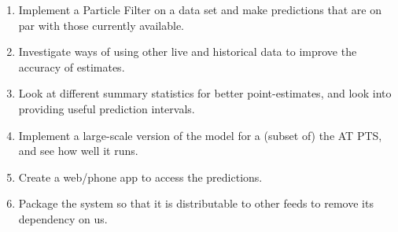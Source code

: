 \documentclass[12pt,a4paper]{article}
\begin{document}
















\begin{enumerate}
\item 
  Implement a Particle Filter on a data set and make predictions that are on par with those currently available.

\item 
  Investigate ways of using other live and historical data to improve the accuracy of estimates.

\item 
  Look at different summary statistics for better point-estimates, and look into providing useful prediction intervals.

\item 
  Implement a large-scale version of the model for a (subset of) the AT PTS, and see how well it runs.

\item 
  Create a web/phone app to access the predictions.

\item
  Package the system so that it is distributable to other feeds to remove its dependency on us.
\end{enumerate}
\end{document}
